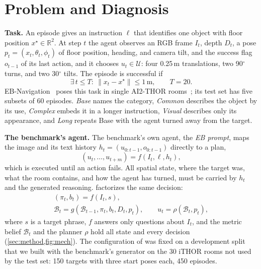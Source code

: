 \section{Problem and Diagnosis}
\label{sec:diagnosis}

\noindent\textbf{Task.}
An episode gives an instruction $\ell$ that identifies one object with floor position $x^\star\in\mathbb{R}^2$.
At step $t$ the agent observes an RGB frame $I_t$, depth $D_t$, a pose $p_t=(x_t,\theta_t,\phi_t)$ of floor
position, heading, and camera tilt, and the success flag $o_{t-1}$ of its last action, and it chooses
$u_t\in\mathcal{U}$: four 0.25\,m translations, two 90$^\circ$ turns, and two 30$^\circ$ tilts. The episode is
successful if
\begin{equation}
\exists\, t\le T:\ \lVert x_t-x^\star\rVert\le 1\,\text{m},\qquad T=20 .
\label{eq:success}
\end{equation}
EB-Navigation~\cite{yang2025embodiedbench} poses this task in single AI2-THOR rooms~\cite{kolve2017ai2thor}; its
test set has five subsets of 60 episodes. \emph{Base} names the category, \emph{Common} describes the object by
its use, \emph{Complex} embeds it in a longer instruction, \emph{Visual} describes only its appearance, and
\emph{Long} repeats Base with the agent turned away from the target.


\noindent\textbf{The benchmark's agent.}
The benchmark's own agent, the \emph{EB prompt}, maps the image and its text history
$h_t=(u_{0:t-1},o_{0:t-1})$ directly to a plan,
\begin{equation}
(u_t,\dots,u_{t+m})=f(I_t,\ell,h_t),
\label{eq:ebpolicy}
\end{equation}
which is executed until an action fails. All spatial state, where the target was, what the room contains, and how
the agent has turned, must be carried by $h_t$ and the generated reasoning. \ours factorizes the same decision:
\begin{equation}
\begin{gathered}
(\pi_t,b_t)=f(I_t,s),\\
\mathcal{B}_t=g(\mathcal{B}_{t-1},\pi_t,b_t,D_t,p_t),\qquad u_t=\rho(\mathcal{B}_t,p_t),
\end{gathered}
\label{eq:factor}
\end{equation}
where $s$ is a target phrase, $f$ answers only questions about $I_t$, and the metric belief $\mathcal{B}_t$ and the
planner $\rho$ hold all state and every decision (\cref{sec:method,fig:mech}). The configuration of \ours was fixed on a
development split that we built with the benchmark's generator on the 30 iTHOR rooms not used by the test set: 150
targets with three start poses each, 450 episodes.

